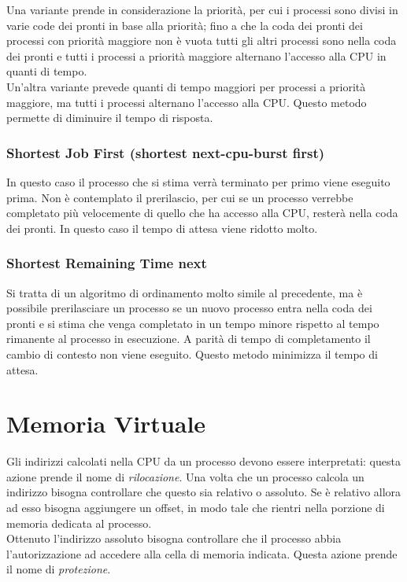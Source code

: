 \documentclass{article}
\begin{document}
Una variante prende in considerazione la priorità, per cui i processi sono divisi in varie code dei pronti in base alla priorità; fino a che la coda dei pronti dei processi con priorità maggiore non è vuota tutti gli altri processi sono nella coda dei pronti e tutti i processi a priorità maggiore alternano l'accesso alla CPU in quanti di tempo.\\

Un'altra variante prevede quanti di tempo maggiori per processi a priorità maggiore, ma tutti i processi alternano l'accesso alla CPU. Questo metodo permette di diminuire il tempo di risposta.

\subsubsection{Shortest Job First (shortest next-cpu-burst first)}
In questo caso il processo che si stima verrà terminato per primo viene eseguito prima. Non è contemplato il prerilascio, per cui se un processo verrebbe completato più velocemente di quello che ha accesso alla CPU, resterà nella coda dei pronti. In questo caso il tempo di attesa viene ridotto molto.

\subsubsection{Shortest Remaining Time next}
Si tratta di un algoritmo di ordinamento molto simile al precedente, ma è possibile prerilasciare un processo se un nuovo processo entra nella coda dei pronti e si stima che venga completato in un tempo minore rispetto al tempo rimanente al processo in esecuzione. A parità di tempo di completamento il cambio di contesto non viene eseguito. Questo metodo minimizza il tempo di attesa.

\section{Memoria Virtuale}
Gli indirizzi calcolati nella CPU da un processo devono essere interpretati: questa azione prende il nome di \textit{rilocazione}. Una volta che un processo calcola un indirizzo bisogna controllare che questo sia relativo o assoluto. Se è relativo allora ad esso bisogna aggiungere un offset, in modo tale che rientri nella porzione di memoria dedicata al processo.\\
Ottenuto l'indirizzo assoluto bisogna controllare che il processo abbia l'autorizzazione ad accedere alla cella di memoria indicata. Questa azione prende il nome di \textit{protezione}.
\end{document}
